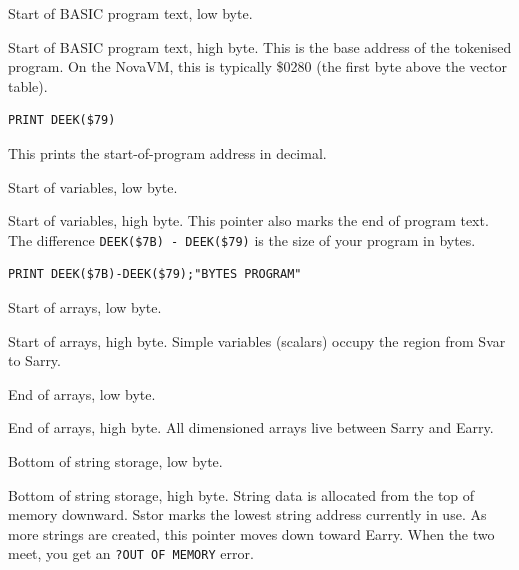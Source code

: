 
Start of BASIC program text, low byte.


Start of BASIC program text, high byte.  This is the base address of the
tokenised program.  On the NovaVM, this is typically \$0280 (the first byte
above the vector table).

\begin{lstlisting}
PRINT DEEK($79)
\end{lstlisting}

This prints the start-of-program address in decimal.


Start of variables, low byte.


Start of variables, high byte.  This pointer also marks the end of program
text.  The difference \texttt{DEEK(\$7B) - DEEK(\$79)} is the size of your
program in bytes.

\begin{lstlisting}
PRINT DEEK($7B)-DEEK($79);"BYTES PROGRAM"
\end{lstlisting}


Start of arrays, low byte.


Start of arrays, high byte.  Simple variables (scalars) occupy the region
from Svar to Sarry.


End of arrays, low byte.


End of arrays, high byte.  All dimensioned arrays live between Sarry and
Earry.


Bottom of string storage, low byte.


Bottom of string storage, high byte.  String data is allocated from the top of
memory downward.  Sstor marks the lowest string address currently in use.  As
more strings are created, this pointer moves down toward Earry.  When the two
meet, you get an \texttt{?OUT OF MEMORY} error.


